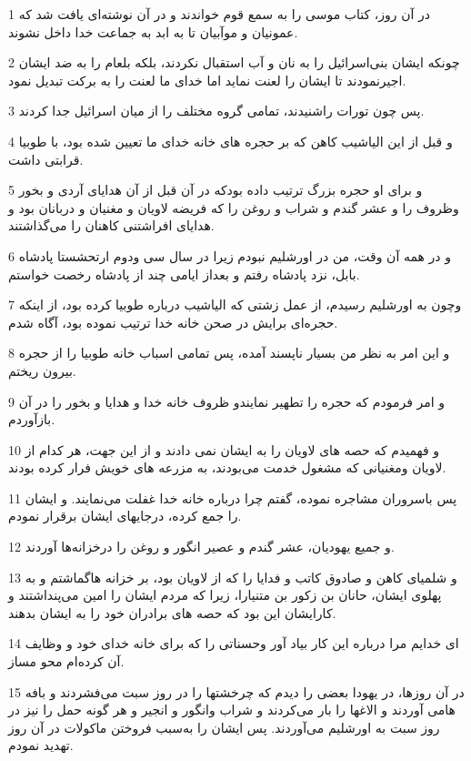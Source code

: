 \par 1 در آن روز، کتاب موسی را به سمع قوم خواندند و در آن نوشته‌ای یافت شد که عمونیان و موآبیان تا به ابد به جماعت خدا داخل نشوند.
\par 2 چونکه ایشان بنی‌اسرائیل را به نان و آب استقبال نکردند، بلکه بلعام را به ضد ایشان اجیرنمودند تا ایشان را لعنت نماید اما خدای ما لعنت را به برکت تبدیل نمود.
\par 3 پس چون تورات راشنیدند، تمامی گروه مختلف را از میان اسرائیل جدا کردند.
\par 4 و قبل از این الیاشیب کاهن که بر حجره های خانه خدای ما تعیین شده بود، با طوبیا قرابتی داشت.
\par 5 و برای او حجره بزرگ ترتیب داده بودکه در آن قبل از آن هدایای آردی و بخور وظروف را و عشر گندم و شراب و روغن را که فریضه لاویان و مغنیان و دربانان بود و هدایای افراشتنی کاهنان را می‌گذاشتند.
\par 6 و در همه آن وقت، من در اورشلیم نبودم زیرا در سال سی ودوم ارتحشستا پادشاه بابل، نزد پادشاه رفتم و بعداز ایامی چند از پادشاه رخصت خواستم.
\par 7 وچون به اورشلیم رسیدم، از عمل زشتی که الیاشیب درباره طوبیا کرده بود، از اینکه حجره‌ای برایش در صحن خانه خدا ترتیب نموده بود، آگاه شدم.
\par 8 و این امر به نظر من بسیار ناپسند آمده، پس تمامی اسباب خانه طوبیا را از حجره بیرون ریختم.
\par 9 و امر فرمودم که حجره را تطهیر نمایندو ظروف خانه خدا و هدایا و بخور را در آن بازآوردم.
\par 10 و فهمیدم که حصه های لاویان را به ایشان نمی دادند و از این جهت، هر کدام از لاویان ومغنیانی که مشغول خدمت می‌بودند، به مزرعه های خویش فرار کرده بودند.
\par 11 پس باسروران مشاجره نموده، گفتم چرا درباره خانه خدا غفلت می‌نمایند. و ایشان را جمع کرده، درجایهای ایشان برقرار نمودم.
\par 12 و جمیع یهودیان، عشر گندم و عصیر انگور و روغن را درخزانه‌ها آوردند.
\par 13 و شلمیای کاهن و صادوق کاتب و فدایا را که از لاویان بود، بر خزانه هاگماشتم و به پهلوی ایشان، حانان بن زکور بن متنیارا، زیرا که مردم ایشان را امین می‌پنداشتند و کارایشان این بود که حصه های برادران خود را به ایشان بدهند.
\par 14 ‌ای خدایم مرا درباره این کار بیاد آور وحسناتی را که برای خانه خدای خود و وظایف آن کرده‌ام محو مساز.
\par 15 در آن روزها، در یهودا بعضی را دیدم که چرخشتها را در روز سبت می‌فشردند و بافه هامی آوردند و الاغها را بار می‌کردند و شراب وانگور و انجیر و هر گونه حمل را نیز در روز سبت به اورشلیم می‌آوردند. پس ایشان را به‌سبب فروختن ماکولات در آن روز تهدید نمودم.
